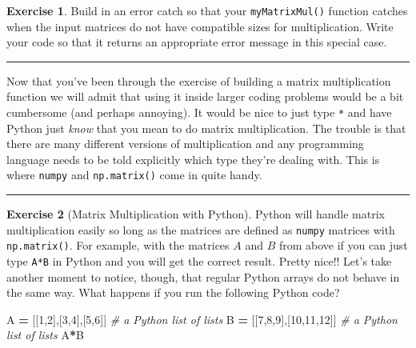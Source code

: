 \documentclass[
]{book}
\newenvironment{Shaded}{\begin{snugshade}}{\end{snugshade}}
\newcommand{\CommentTok}[1]{\textcolor[rgb]{0.56,0.35,0.01}{\textit{#1}}}
\newcommand{\DecValTok}[1]{\textcolor[rgb]{0.00,0.00,0.81}{#1}}
\newcommand{\NormalTok}[1]{#1}
\newcommand{\OperatorTok}[1]{\textcolor[rgb]{0.81,0.36,0.00}{\textbf{#1}}}
\theoremstyle{definition}
\theoremstyle{definition}
\theoremstyle{definition}
\newtheorem{exercise}{Exercise}[chapter]
\theoremstyle{remark}
\begin{document}
\begin{exercise}
\protect\hypertarget{exr:unnamed-chunk-306}{}{\label{exr:unnamed-chunk-306} }Build in an error catch so that your \texttt{myMatrixMul()} function catches when the input matrices do not have compatible sizes for multiplication. Write your code so that it returns an appropriate error message in this special case.
\end{exercise}

\begin{center}\rule{0.5\linewidth}{0.5pt}\end{center}

Now that you've been through the exercise of building a matrix multiplication function we will admit that using it inside larger coding problems would be a bit cumbersome (and perhaps annoying). It would be nice to just type \texttt{*} and have Python just \emph{know} that you mean to do matrix multiplication. The trouble is that there are many different versions of multiplication and any programming language needs to be told explicitly which type they're dealing with. This is where \texttt{numpy} and \texttt{np.matrix()} come in quite handy.

\begin{center}\rule{0.5\linewidth}{0.5pt}\end{center}

\begin{exercise}[Matrix Multiplication with Python]
\protect\hypertarget{exr:unnamed-chunk-307}{}{\label{exr:unnamed-chunk-307} {} }Python will handle matrix multiplication easily so long as the matrices are defined as \texttt{numpy} matrices with \texttt{np.matrix()}. For example, with the matrices \(A\) and \(B\) from above if you can just type \texttt{A*B} in Python and you will get the correct result. Pretty nice!! Let's take another moment to notice, though, that regular Python arrays do not behave in the same way. What happens if you run the following Python code?
\end{exercise}

\begin{Shaded}
\begin{Highlighting}[]
\NormalTok{A }\OperatorTok{=}\NormalTok{ [[}\DecValTok{1}\NormalTok{,}\DecValTok{2}\NormalTok{],[}\DecValTok{3}\NormalTok{,}\DecValTok{4}\NormalTok{],[}\DecValTok{5}\NormalTok{,}\DecValTok{6}\NormalTok{]] }\CommentTok{\# a Python list of lists}
\NormalTok{B }\OperatorTok{=}\NormalTok{ [[}\DecValTok{7}\NormalTok{,}\DecValTok{8}\NormalTok{,}\DecValTok{9}\NormalTok{],[}\DecValTok{10}\NormalTok{,}\DecValTok{11}\NormalTok{,}\DecValTok{12}\NormalTok{]] }\CommentTok{\# a Python list of lists}
\NormalTok{A}\OperatorTok{*}\NormalTok{B}
\end{Highlighting}
\end{Shaded}
\end{document}
